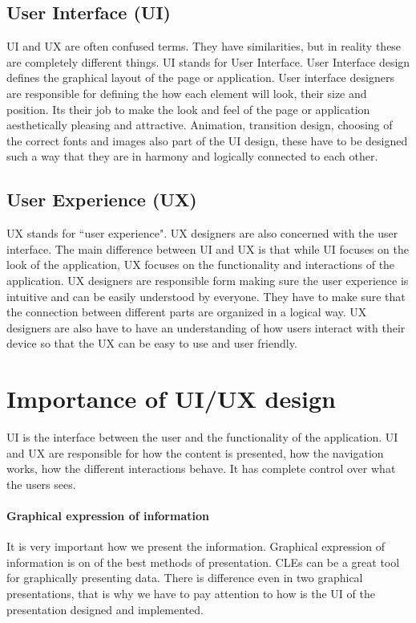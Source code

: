 \documentclass[10pt,english,a4paper]{article}
\begin{document}
\subsection{User Interface (UI)}
UI and UX are often confused terms\cite{theymakedesign_2019_what}. They have similarities, but in reality
these are completely different things.
UI stands for User Interface. User Interface design defines the graphical layout of the page or application.
User interface designers are responsible for defining the how each element will look, their size and position.
Its their job to make the look and feel of the page or application aesthetically pleasing and 
attractive. Animation, transition design, choosing of the correct fonts and images also part of the UI design, 
these have to be designed such a way that they are in harmony and logically connected to each other\cite{theymakedesign_2019_what}.


\subsection{User Experience (UX)}
UX stands for ``user experience". UX designers are also concerned with the user interface\cite{theymakedesign_2019_what}. 
The main difference between UI and UX is that while UI focuses on the look of the application,
UX focuses on the functionality and interactions of the application. UX designers are 
responsible form making sure the user experience is intuitive and can be easily understood by everyone.
They have to make sure that the connection between different parts are organized in a logical way.
UX designers are also have to have an understanding of how users interact with their
device so that the UX can be easy to use and user friendly\cite{theymakedesign_2019_what}. 

\section{Importance of UI/UX design}\label{importance}
UI is the interface between the user and the functionality of the application. UI and UX are responsible for
how the content is presented, how the navigation works, how the different interactions behave. It 
has complete control over what the users sees.

\paragraph{Graphical expression of information}
It is very important how we present the information. Graphical expression of information is on of the best methods of presentation. CLEs can be
a great tool for graphically presenting data. There is difference even in two graphical presentations,
that is why we have to pay attention to how is the UI of the presentation designed and implemented. 
\end{document}
